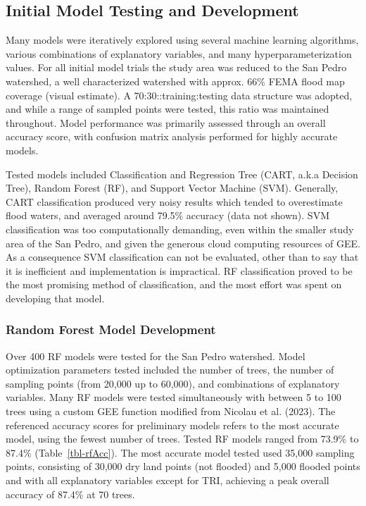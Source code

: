 \documentclass[
]{agujournal2019}
\begin{document}
\subsection{Initial Model Testing and
Development}\label{initial-model-testing-and-development}

Many models were iteratively explored using several machine learning
algorithms, various combinations of explanatory variables, and many
hyperparameterization values. For all initial model trials the study
area was reduced to the San Pedro watershed, a well characterized
watershed with approx. 66\% FEMA flood map coverage (visual estimate). A
70:30::training:testing data structure was adopted, and while a range of
sampled points were tested, this ratio was maintained throughout. Model
performance was primarily assessed through an overall accuracy score,
with confusion matrix analysis performed for highly accurate models.

Tested models included Classification and Regression Tree (CART, a.k.a
Decision Tree), Random Forest (RF), and Support Vector Machine (SVM).
Generally, CART classification produced very noisy results which tended
to overestimate flood waters, and averaged around 79.5\% accuracy (data
not shown). SVM classification was too computationally demanding, even
within the smaller study area of the San Pedro, and given the generous
cloud computing resources of GEE. As a consequence SVM classification
can not be evaluated, other than to say that it is inefficient and
implementation is impractical. RF classification proved to be the most
promising method of classification, and the most effort was spent on
developing that model.

\subsubsection{Random Forest Model
Development}\label{random-forest-model-development}

Over 400 RF models were tested for the San Pedro watershed. Model
optimization parameters tested included the number of trees, the number
of sampling points (from 20,000 up to 60,000), and combinations of
explanatory variables. Many RF models were tested simultaneously with
between 5 to 100 trees using a custom GEE function modified from Nicolau
et al. (2023). The referenced accuracy scores for preliminary models
refers to the most accurate model, using the fewest number of trees.
Tested RF models ranged from 73.9\% to 87.4\% (Table~\ref{tbl-rfAcc}).
The most accurate model tested used 35,000 sampling points, consisting
of 30,000 dry land points (not flooded) and 5,000 flooded points and
with all explanatory variables except for TRI, achieving a peak overall
accuracy of 87.4\% at 70 trees.
\end{document}
